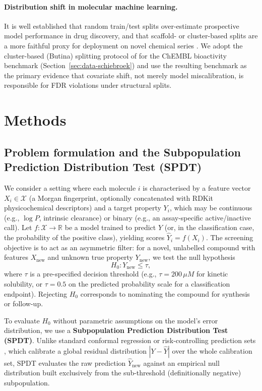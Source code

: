 \documentclass[11pt]{article}
\newcommand{\Xcal}{\mathcal{X}}
\begin{document}
\paragraph{Distribution shift in molecular machine learning.}
It is well established that random train/test splits over-estimate
prospective model performance in drug discovery, and that scaffold- or
cluster-based splits are a more faithful proxy for deployment on novel
chemical series \citep{martin2017,wu2018moleculenet}. We adopt the
cluster-based (Butina) splitting protocol of \citet{schiebroek2026} for the
ChEMBL bioactivity benchmark (Section~\ref{sec:data-schiebroek}) and use the
resulting benchmark as the primary evidence that covariate shift, not merely
model miscalibration, is responsible for FDR violations under structural
splits.

\section{Methods}
\label{sec:methods}

\subsection{Problem formulation and the Subpopulation Prediction Distribution
Test (SPDT)}
\label{sec:spdt}

We consider a setting where each molecule $i$ is characterised by a feature
vector $X_i \in \Xcal$ (a Morgan fingerprint, optionally concatenated with
RDKit physicochemical descriptors) and a target property $Y_i$, which may be
continuous (e.g., $\log P$, intrinsic clearance) or binary (e.g., an
assay-specific active/inactive call). Let $f: \Xcal \to \mathbb{R}$ be a model
trained to predict $Y$ (or, in the classification case, the probability of the
positive class), yielding scores $\hat Y_i = f(X_i)$. The screening objective
is to act as an asymmetric filter: for a novel, unlabelled compound with
features $X_{\mathrm{new}}$ and unknown true property $Y_{\mathrm{new}}$, we
test the null hypothesis
\[
H_0 : Y_{\mathrm{new}} \le \tau ,
\]
where $\tau$ is a pre-specified decision threshold (e.g., $\tau = 200\,\mu M$
for kinetic solubility, or $\tau = 0.5$ on the predicted probability scale for
a classification endpoint). Rejecting $H_0$ corresponds to nominating the
compound for synthesis or follow-up.

To evaluate $H_0$ without parametric assumptions on the model's error
distribution, we use a \textbf{Subpopulation Prediction Distribution Test
(SPDT)}. Unlike standard conformal regression or risk-controlling prediction
sets \citep{bates2021}, which calibrate a global residual distribution
$|Y - \hat Y|$ over the whole calibration set, SPDT evaluates the raw
prediction $\hat Y_{\mathrm{new}}$ against an empirical null distribution
built exclusively from the sub-threshold (definitionally negative)
subpopulation.
\end{document}
